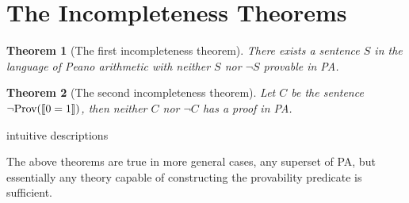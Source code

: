 \documentclass[12pt]{article}
\DeclarePairedDelimiter{\enc}{[\![}{]\!]}
\newcommand{\prov}{\text{Prov}}
\newtheorem{theorem}{Theorem}
\begin{document}
	\section{The Incompleteness Theorems}
	
	\begin{theorem}[The first incompleteness theorem]
		There exists a sentence $S$ in the language of Peano arithmetic with neither $S$ nor $\lnot S$ provable in PA.
	\end{theorem}

	\begin{theorem}[The second incompleteness theorem]
		Let $C$ be the sentence $\lnot\prov(\enc{0=1})$, then neither $C$ nor $\lnot C$ has a proof in PA.		
	\end{theorem}

	\begin{tcolorbox}[colback=red!5!white,colframe=red!75!black,title=TODO]
		intuitive descriptions
	\end{tcolorbox}

	The above theorems are true in more general cases, any superset of PA, but essentially any theory capable of constructing the provability predicate is sufficient.
	
\end{document}
